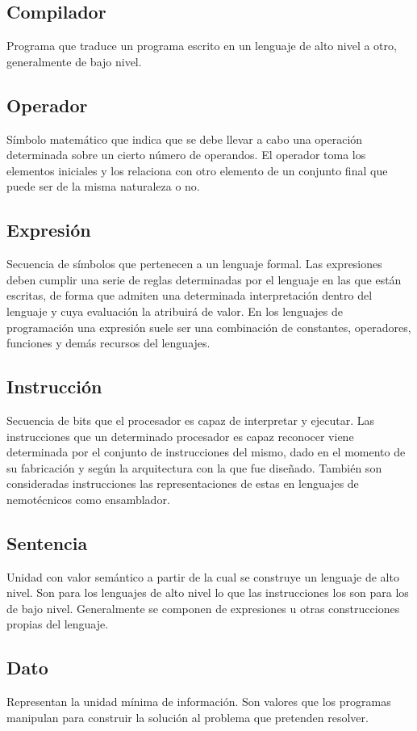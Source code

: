 \subsection{Compilador}
Programa que traduce un programa escrito en un lenguaje de alto nivel a otro, generalmente de bajo nivel.  

\subsection{Operador}
Símbolo matemático que indica que se debe llevar a cabo una operación determinada sobre un cierto número de operandos. 
El operador toma los elementos iniciales y los relaciona con otro elemento de un conjunto final que puede ser de la misma naturaleza o no.

\subsection{Expresión}
Secuencia de símbolos que pertenecen a un lenguaje formal. Las expresiones deben cumplir una serie de reglas determinadas por el lenguaje 
en las que están escritas, de forma que admiten una determinada interpretación dentro del lenguaje y cuya evaluación la atribuirá de valor. 
En los lenguajes de programación una expresión suele ser una combinación de constantes, operadores, funciones y demás recursos del lenguajes. 

\subsection{Instrucción}
Secuencia de bits que el procesador es capaz de interpretar y ejecutar. Las instrucciones que un determinado procesador es capaz reconocer 
viene determinada por el conjunto de instrucciones del mismo, dado en el momento de su fabricación y según la arquitectura con la que fue diseñado. 
También son consideradas instrucciones las representaciones de estas en lenguajes de nemotécnicos como ensamblador.
 
\subsection{Sentencia}
Unidad con valor semántico a partir de la cual se construye un lenguaje de alto nivel. Son para los lenguajes de alto nivel lo que las instrucciones
los son para los de bajo nivel. Generalmente se componen de expresiones u otras construcciones propias del lenguaje.

\subsection{Dato}
Representan la unidad mínima de información. Son valores que los programas manipulan para construir la solución al problema que pretenden resolver.

